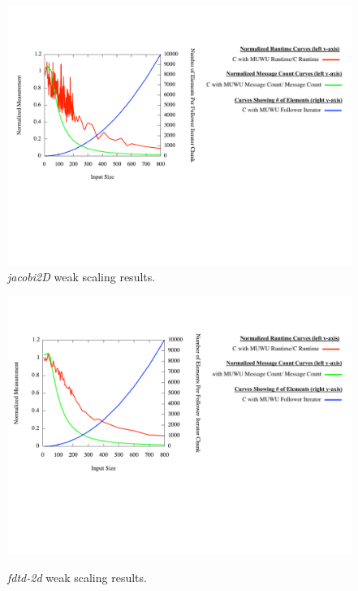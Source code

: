 \begin{figure}
\begin{center}
\includegraphics[width=\linewidth]{./Figures/input_variation_exp/jacobi-2d.pdf}
\caption{\textit{jacobi2D} weak scaling results.\label{jacobi-2d_weak_scaling}}
\end{center}
\end{figure}

\begin{figure}
\begin{center}
\includegraphics[width=\linewidth]{./Figures/input_variation_exp/fdtd2d.pdf}
\renewcommand{\baselinestretch}{1}
\small\normalsize
\begin{quote}
\caption[\textit{fdtd-2d} weak scaling results]{\textit{fdtd-2d} weak scaling results.\label{fdtd-2d_weak_scaling}}
\end{quote}
\end{center}
\end{figure}

